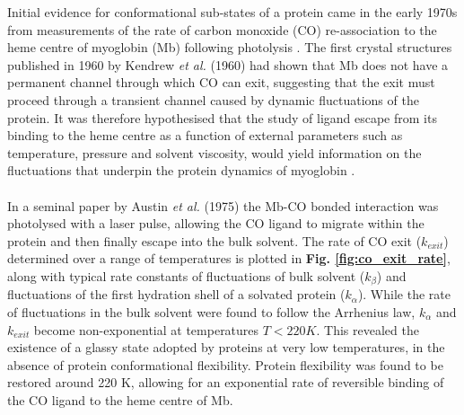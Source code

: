 %
%
%
\clearpage
%
%
Initial evidence for conformational sub-states of a protein came in the early 1970s from measurements of the rate of carbon monoxide (CO) re-association to the heme centre of myoglobin (Mb) following photolysis \cite{Alberding:1976aa,Austin:1973aa,Austin:1975aa}. The first crystal structures published in 1960 by Kendrew \textit{et al.} (1960) \cite{KENDREW:1960aa} had shown that Mb does not have a permanent channel through which CO can exit, suggesting that the exit must proceed through a transient channel caused by dynamic fluctuations of the protein. It was therefore hypothesised that the study of ligand escape from its binding to the heme centre as a function of external parameters such as temperature, pressure and solvent viscosity, would yield information on the fluctuations that underpin the protein dynamics of myoglobin \cite{Frauenfelder:1978aa}.
%
%
\\\\
%
%
In a seminal paper by Austin \textit{et al.} (1975) \cite{Austin:1975aa} the Mb-CO bonded interaction was photolysed with a laser pulse, allowing the CO ligand to migrate within the protein and then finally escape into the bulk solvent. The rate of CO exit ($k_{exit}$) determined over a range of temperatures is plotted in \textbf{Fig. \ref{fig:co_exit_rate}}, along with typical rate constants of fluctuations of bulk solvent ($k_{\beta}$) and fluctuations of the first hydration shell of a solvated protein ($k_{\alpha}$). While the rate of fluctuations in the bulk solvent were found to follow the Arrhenius law, $k_{\alpha}$ and $k_{exit}$ become non-exponential at temperatures $T < 220 K$. This revealed the existence of a glassy state adopted by proteins at very low temperatures, in the absence of protein conformational flexibility. Protein flexibility was found to be restored around 220 K, allowing for an exponential rate of reversible binding of the CO ligand to the heme centre of Mb.
%
%
%
